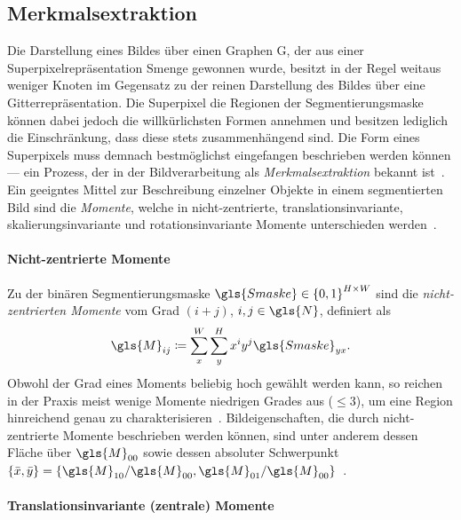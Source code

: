 \subsection{Merkmalsextraktion}
\label{merkmalsextraktion}

Die Darstellung eines Bildes über einen Graphen \gls{G}, der aus einer Superpixelrepräsentation \gls{Smenge} gewonnen wurde, besitzt in der Regel weitaus weniger Knoten im Gegensatz zu der reinen Darstellung des Bildes über eine Gitterrepräsentation.
Die Superpixel \bzw{} die Regionen der Segmentierungsmaske können dabei jedoch die willkürlichsten Formen annehmen und besitzen lediglich die Einschränkung, dass diese stets zusammenhängend sind.
Die Form eines Superpixels muss demnach bestmöglichst eingefangen \bzw{} beschrieben werden können — ein Prozess, der in der Bildverarbeitung als \emph{Merkmalsextraktion} bekannt ist~\cite{momente}.
Ein geeigntes Mittel zur Beschreibung einzelner Objekte in einem segmentierten Bild sind die \emph{Momente}, welche in nicht-zentrierte, translationsinvariante, skalierungsinvariante und rotationsinvariante Momente unterschieden werden~\cite{momente}.

\paragraph{Nicht-zentrierte Momente}
\label{nicht_zentrierte_momente}

Zu der binären Segmentierungsmaske $\gls{Smaske} \in {\left\{0, 1\right\}}^{H \times W}$ sind die \emph{nicht-zentrierten Momente} vom Grad $\left(i+j\right)$, $i,j\in\gls{N}$, definiert als~\cite{momente}
\begin{equation*}
  \gls{M}_{ij} \coloneqq \sum_x^W \sum_y^H x^i y^j \gls{Smaske}_{yx}.
\end{equation*}
Obwohl der Grad eines Moments beliebig hoch gewählt werden kann, so reichen in der Praxis meist wenige Momente niedrigen Grades aus ($\le 3$), um eine Region hinreichend genau zu charakterisieren~\cite{momente}.
Bildeigenschaften, die durch nicht-zentrierte Momente beschrieben werden können, sind unter anderem dessen Fläche über $\gls{M}_{00}$ sowie dessen absoluter Schwerpunkt $\left\{\bar{x}, \bar{y}\right\} = \left\{ \gls{M}_{10}/\gls{M}_{00}, \gls{M}_{01}/\gls{M}_{00}\right\}$~\cite{momente}.

\paragraph{Translationsinvariante (zentrale) Momente}
\label{translationsinvariante_momente}

